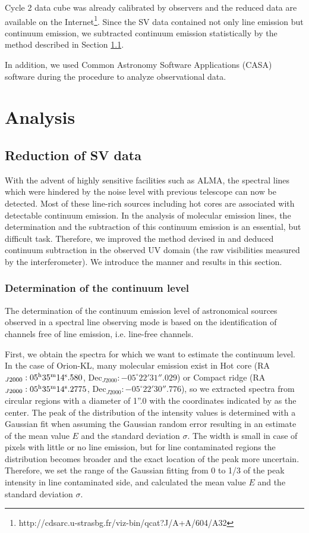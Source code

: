 Cycle 2 data cube was already calibrated by observers and the reduced data are available on 
the Internet\footnote{http://cdsarc.u-strasbg.fr/viz-bin/qcat?J/A+A/604/A32}.
Since the SV data contained not only line emission but continuum emission, 
we subtracted continuum emission statistically by the method described in Section \ref{sec:Statcont}.

In addition, we used Common Astronomy Software Applications (CASA) software \citep{McMullin+2007} 
during the procedure to analyze observational data.

\newpage
\section{Analysis}
\subsection{Reduction of SV data}
\label{sec:Statcont}

With the advent of highly sensitive facilities such as ALMA, the spectral lines which were hindered 
by the noise level with previous telescope can now be detected.
Most of these line-rich sources including hot cores are associated with detectable continuum emission.
In the analysis of molecular emission lines, the determination and the subtraction of this continuum 
emission is an essential, but difficult task. 
Therefore, we improved the method devised in \citet{Sanchez-Monge+2017} and deduced continuum subtraction 
in the observed UV domain (the raw visibilities measured by the interferometer).
We introduce the manner and results in this section.

\subsubsection*{Determination of the continuum level}
The determination of the continuum emission level of astronomical sources observed in a spectral line 
observing mode is based on the identification of channels free of line emission, i.e. line-free channels.

First, we obtain the spectra for which we want to estimate the continuum level.  
In the case of Orion-KL, many molecular emission exist in Hot core
(RA$_{J2000}: 05^{\rm{h}}35^{\rm{m}}14^{\rm{s}}.580$, Dec$_{J2000}:-05^{\circ}22'31''.029$) or 
Compact ridge (RA$_{J2000}: 05^{\rm{h}}35^{\rm{m}}14^{\rm{s}}.2775$, Dec$_{J2000}:-05^{\circ}22'30''.776$), 
so we extracted spectra from circular regions with a diameter of 1''.0  with the coordinates indicated by 
\citet{Hirota+2015} as the center.
The peak of the distribution of the intensity values is determined with a Gaussian fit 
when assuming the Gaussian random error resulting in an estimate of the mean value $E$ 
and the standard deviation $\sigma$. 
The width is small in case of pixels with little or no line emission, but for line contaminated 
regions the distribution becomes broader and the exact location of the peak more uncertain. 
Therefore, we set the range of the Gaussian fitting from 0 to 1/3 of the peak intensity in line contaminated side,
and calculated the mean value $E$ and the standard deviation $\sigma$.

